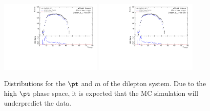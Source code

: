 \begin{figure}[h!]
  \centering
  \includegraphics[page=69,width=0.45\textwidth]{figures/ZjetOmnifoldMCDataComp.pdf}
  \includegraphics[page=70,width=0.45\textwidth]{figures/ZjetOmnifoldMCDataComp.pdf}
  \caption{Distributions for the $\pt$ and $m$ of the dilepton system. Due to the high $\pt$ phase space, it is expected that the MC simulation will underpredict the data.}
  \label{fig:pTmll}
\end{figure}

